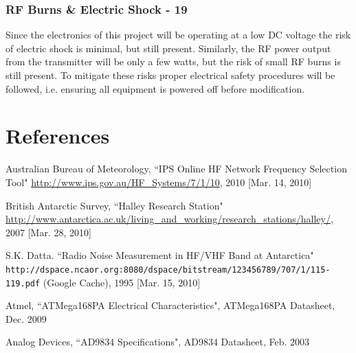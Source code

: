 \documentclass[a4paper,12pt]{article}
\begin{document}
\subsubsection*{RF Burns \& Electric Shock - 19}
Since the electronics of this project will be operating at a low DC voltage the risk of electric shock is minimal, but still present. Similarly, the RF power output from the transmitter will be only a few watts, but the risk of small RF burns is still present. To mitigate these risks proper electrical safety procedures will be followed, i.e. ensuring all equipment is powered off before modification.


\newpage
\section{References}

\renewcommand*{\refname}{\vspace*{-12mm}}
\begin{thebibliography}{99}
Australian Bureau of Meteorology, ``IPS Online HF Network Frequency Selection Tool" \url{http://www.ips.gov.au/HF\_Systems/7/1/10}, 2010 [Mar. 14, 2010]

British Antarctic Survey, ``Halley Research Station" \url{http://www.antarctica.ac.uk/living_and_working/research_stations/halley/}, 2007 [Mar. 28, 2010]

S.K. Datta. ``Radio Noise Measurement in HF/VHF Band at Antarctica" \texttt{http://dspace.ncaor.org:8080/dspace/bitstream/123456789/707/1/115-119.pdf} (Google Cache), 1995 [Mar. 15, 2010]

Atmel, ``ATMega168PA Electrical Characteristics", ATMega168PA Datasheet, Dec. 2009

Analog Devices, ``AD9834 Specifications", AD9834 Datasheet, Feb. 2003

\end{thebibliography}
%
%
\end{document}

